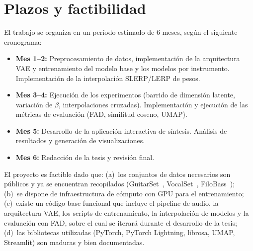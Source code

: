 \documentclass[a4paper,11pt,titlepage]{article}
\begin{document}
\section*{Plazos y factibilidad}

El trabajo se organiza en un período estimado de 6 meses, según el siguiente cronograma:

\begin{itemize}
    \item \textbf{Mes 1--2:} Preprocesamiento de datos, implementación de la arquitectura
    VAE y entrenamiento del modelo base y los modelos por instrumento. Implementación
    de la interpolación SLERP/LERP de pesos.
    \item \textbf{Mes 3--4:} Ejecución de los experimentos (barrido de dimensión latente,
    variación de $\beta$, interpolaciones cruzadas). Implementación y ejecución de las
    métricas de evaluación (FAD, similitud coseno, UMAP).
    \item \textbf{Mes 5:} Desarrollo de la aplicación interactiva de síntesis.
    Análisis de resultados y generación de visualizaciones.
    \item \textbf{Mes 6:} Redacción de la tesis y revisión final.
\end{itemize}

El proyecto es factible dado que: (a)~los conjuntos de datos necesarios son públicos y
ya se encuentran recopilados (GuitarSet~\cite{xi2019guitarset},
VocalSet~\cite{wilkins2018vocalset}, FiloBass~\cite{riley2023filobass});
(b)~se dispone de infraestructura de cómputo con GPU para el entrenamiento;
(c)~existe un código base funcional que incluye el pipeline de audio, la arquitectura VAE,
los scripts de entrenamiento, la interpolación de modelos y la evaluación con FAD,
sobre el cual se iterará durante el desarrollo de la tesis;
(d)~las bibliotecas utilizadas (PyTorch, PyTorch Lightning, librosa, UMAP, Streamlit)
son maduras y bien documentadas.
 




 \small
 
\end{document}
